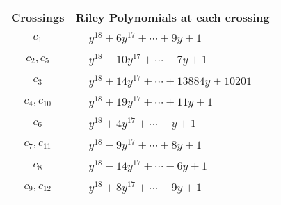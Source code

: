 \documentclass[1p]{elsarticle_modified}
\theoremstyle{definition}
\begin{document}
\begin{tabular}{m{50pt}|m{274pt}}
Crossings & \hspace{64pt}Riley Polynomials at each crossing \\
\hline $$\begin{aligned}c_{1}\end{aligned}$$&$\begin{aligned}
&y^{18}+6 y^{17}+\cdots+9 y+1
\end{aligned}$\\
\hline $$\begin{aligned}c_{2},c_{5}\end{aligned}$$&$\begin{aligned}
&y^{18}-10 y^{17}+\cdots-7 y+1
\end{aligned}$\\
\hline $$\begin{aligned}c_{3}\end{aligned}$$&$\begin{aligned}
&y^{18}+14 y^{17}+\cdots+13884 y+10201
\end{aligned}$\\
\hline $$\begin{aligned}c_{4},c_{10}\end{aligned}$$&$\begin{aligned}
&y^{18}+19 y^{17}+\cdots+11 y+1
\end{aligned}$\\
\hline $$\begin{aligned}c_{6}\end{aligned}$$&$\begin{aligned}
&y^{18}+4 y^{17}+\cdots- y+1
\end{aligned}$\\
\hline $$\begin{aligned}c_{7},c_{11}\end{aligned}$$&$\begin{aligned}
&y^{18}-9 y^{17}+\cdots+8 y+1
\end{aligned}$\\
\hline $$\begin{aligned}c_{8}\end{aligned}$$&$\begin{aligned}
&y^{18}-14 y^{17}+\cdots-6 y+1
\end{aligned}$\\
\hline $$\begin{aligned}c_{9},c_{12}\end{aligned}$$&$\begin{aligned}
&y^{18}+8 y^{17}+\cdots-9 y+1
\end{aligned}$\\
\hline
\end{tabular}\\~\\
\end{document}
